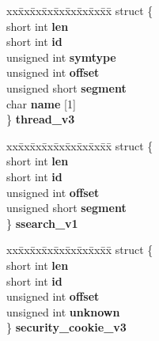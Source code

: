 \begin{DoxyCompactItemize}
\begin{tabbing}
\end{tabbing}\item 
\mbox{\label{unioncodeview__symbol_a7e952c0c7c2140dd808b06a4ae4ceb93}} 
\begin{tabbing}
xx\=xx\=xx\=xx\=xx\=xx\=xx\=xx\=xx\=\kill
struct \{\\
\>short int {\bfseries len}\\
\>short int {\bfseries id}\\
\>unsigned int {\bfseries symtype}\\
\>unsigned int {\bfseries offset}\\
\>unsigned short {\bfseries segment}\\
\>char {\bfseries name} \mbox{[}1\mbox{]}\\
\} {\bfseries thread\_v3}\\

\end{tabbing}\item 
\mbox{\label{unioncodeview__symbol_acd0086a4c32ca617951783eb87769502}} 
\begin{tabbing}
xx\=xx\=xx\=xx\=xx\=xx\=xx\=xx\=xx\=\kill
struct \{\\
\>short int {\bfseries len}\\
\>short int {\bfseries id}\\
\>unsigned int {\bfseries offset}\\
\>unsigned short {\bfseries segment}\\
\} {\bfseries ssearch\_v1}\\

\end{tabbing}\item 
\mbox{\label{unioncodeview__symbol_a92ab30c7e29e44608ccab982fe0d244c}} 
\begin{tabbing}
xx\=xx\=xx\=xx\=xx\=xx\=xx\=xx\=xx\=\kill
struct \{\\
\>short int {\bfseries len}\\
\>short int {\bfseries id}\\
\>unsigned int {\bfseries offset}\\
\>unsigned int {\bfseries unknown}\\
\} {\bfseries security\_cookie\_v3}\\


\end{tabbing}
\end{DoxyCompactItemize}
